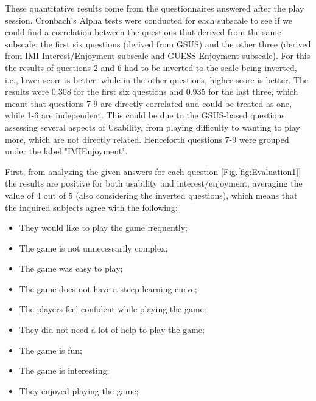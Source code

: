 \par These quantitative results come from the questionnaires answered after the play session. Cronbach's Alpha tests were conducted for each subscale to see if we could find a correlation between the questions that derived from the same subscale: the first six questions (derived from GSUS) and the other three (derived from IMI Interest/Enjoyment subscale and GUESS Enjoyment subscale). For this the results of questions 2 and 6 had to be inverted to the scale being inverted, i.e., lower score is better, while in the other questions, higher score is better. The results were 0.308 for the first six questions and 0.935 for the last three, which meant that questions 7-9 are directly correlated and could be treated as one, while 1-6 are independent. This could be due to the GSUS-based questions assessing several aspects of Usability, from playing difficulty to wanting to play more, which are not directly related. Henceforth questions 7-9 were grouped under the label "IMI\textunderscore Enjoyment".
\par First, from analyzing the given answers for each question [Fig.\ref{fig:Evaluation1}] the results are positive for both usability and interest/enjoyment, averaging the value of 4 out of 5 (also considering the inverted questions), which means that the inquired subjects agree with the following: 
\begin{itemize}
	\item They would like to play the game frequently;
	\item The game is not unnecessarily complex;
	\item The game was easy to play;
	\item The game does not have a steep learning curve;
	\item The players feel confident while playing the game;
	\item They did not need a lot of help to play the game;
	\item The game is fun;
	\item The game is interesting;
	\item They enjoyed playing the game;
\end{itemize}
